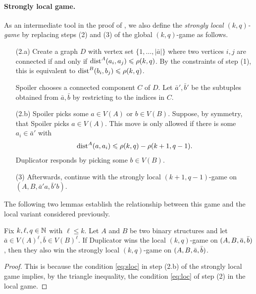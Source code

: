 \paragraph{Strongly local game.}
As an intermediate tool in the proof of ,
we also define the \emph{strongly local \((k,q)\)-game} by replacing steps (2) and (3) of the global \((k,q)\)-game
as follows.
\begin{itemize}
    \item[(2.a)]\label{sl:2a}
    Create a graph \(D\) with vertex set \(\{1,\dots,|\bar a|\}\) where two vertices \(i,j\) are connected
        if and only if \(\mathrm{dist}^A(a_i,a_j) \leqslant \rho(k,q)\).
        By the constraints of step (1),
        this is equivalent to \(\mathrm{dist}^B(b_i,b_j) \leqslant \rho(k,q)\).

    Spoiler chooses a connected component $C$ of $D$.
    Let \(\bar a',\bar b'\) be the subtuples obtained from \(\bar a,\bar b\) by restricting to the indices in $C$. 
    
    \item[(2.b)]\label{sl:2b}
     Spoiler picks some  $a\in V(A)$ or $b\in V(B)$.
    Suppose, by symmetry, that Spoiler picks $a\in V(A)$.
     This move is only allowed if there is some $a_i\in \bar a'$
    with
    \begin{align}\label{eq:sloc}
        \dist^A(a,a_i) \le \rho(k,q)-\rho(k+1,q-1).    %
    \end{align}
     Duplicator responds by picking some $b\in V(B)$.
    
    \item[(3)]\label{sl:3}
    Afterwards, continue with the strongly local \((k+1,q-1)\)-game on \((A,B,\bar a' a,\bar b' b)\).
\end{itemize}

The following two lemmas establish the relationship between this game and the local variant considered previously.
\begin{lemma}\label{lem:local-slocal}
    Fix $k,\ell,q\in\mathbb N$ with $\ell\le k$.
    Let \(A\) and \(B\) be two binary structures
    and let \(\bar a\in V(A)^\ell,\bar b\in V(B)^\ell\).    
    If  Duplicator wins the local \((k,q)\)-game on \((A,B, \bar a, \bar b)\), then 
 they also win the strongly local \((k,q)\)-game on \((A,B, \bar a, \bar b)\).
\end{lemma}
\begin{proof}
    This is because the condition \eqref{eq:sloc} in step (2.b) of the strongly local game
    implies, by the triangle inequality, the condition \eqref{eq:loc} of step (2) in the local game.
\end{proof}


